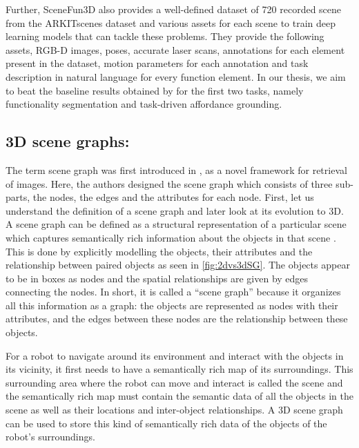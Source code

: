 Further, SceneFun3D also provides a well-defined dataset of 720 recorded scene from the ARKITscenes dataset and various assets for each scene 
to train deep learning models that can tackle these problems. They provide the following assets, RGB-D images, poses, accurate laser scans, 
annotations for each element present in the dataset, motion parameters for each annotation and task description in natural language for every function element.
In our thesis, we aim to beat the baseline results obtained by \citet{delitzas2024scenefun3d} for the first two tasks, namely 
functionality segmentation and task-driven affordance grounding. 

\subsection{3D scene graphs:}
The term scene graph was first introduced in \cite{7298990}, as a novel framework for retrieval of images. Here, the authors designed the scene graph which 
consists of three sub-parts, the nodes, the edges and the attributes for each node. First, let us understand the definition of a scene graph and later
look at its evolution to 3D. 
A scene graph can be defined as a structural representation of a particular scene which captures semantically rich information about the objects in that scene \cite{zhu2022scenegraphgenerationcomprehensive}.
This is done by explicitly modelling the objects, their attributes and the relationship between paired objects as seen in \cref{fig:2dvs3dSG}. The objects appear to be in boxes as nodes
and the spatial relationships are given by edges connecting the nodes.
In short, it is called a “scene graph” because it organizes all this information as a graph: the objects are represented as nodes with their attributes, and the edges between these 
nodes are the relationship between these objects. 

For a robot to navigate around its environment and interact with the objects in its vicinity, it first needs to have a semantically rich map of its surroundings. 
This surrounding area where the robot can move and interact is called the scene and the semantically rich map must contain the 
semantic data of all the objects in the scene as well as their locations and inter-object relationships. 
A 3D scene graph can be used to store this kind of semantically rich data of the objects of the robot’s surroundings. 

